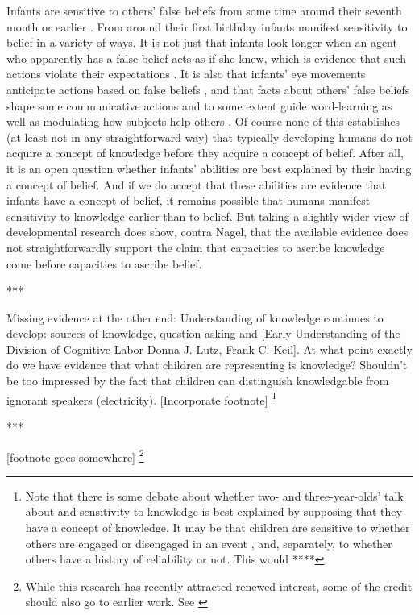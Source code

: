 \documentclass[11pt,a4paper]{extarticle}
\begin{document}
Infants are sensitive to others' false beliefs from some time around their seventh month or earlier \citep{kovacs_social_2010}.
From around their first birthday infants manifest sensitivity to belief in a variety of ways.
It is not just that infants look longer when an agent who apparently has a false belief acts as if she knew, which is evidence that such actions violate their expectations  \citep{Onishi:2005hm,Surian:2007hl}.
It is also that infants' eye movements anticipate actions based on false beliefs \citep{Southgate:2007js},
and that facts about others' false beliefs shape some communicative actions \citep{Knudsen:2011fk} and to some extent guide word-learning \citep{Carpenter:2002gc} as well as modulating how subjects help others \citep{Buttelmann:2009gy}.
Of course none of this establishes (at least not in any straightforward way) that typically developing humans do not acquire a concept of knowledge before they acquire a concept of belief.
After all, it is an open question whether infants' abilities are best explained by their having a concept of belief.
And if we do accept that these abilities are evidence that infants have a concept of belief, it remains possible that humans manifest sensitivity to knowledge earlier than to belief.
But taking a slightly wider view of developmental research does show, contra Nagel, that the available evidence does not  straightforwardly support the claim that capacities to ascribe knowledge come before  capacities to ascribe  belief.


***

Missing evidence at the other end:
Understanding of knowledge continues to develop: sources of knowledge, question-asking and [Early Understanding of the Division of Cognitive Labor Donna J. Lutz, Frank C. Keil].
At what point exactly do we have evidence that what children are representing is knowledge?
Shouldn't be too impressed by the fact that children can distinguish knowledgable from ignorant speakers (electricity).
[Incorporate footnote]%
\footnote{
Note that there is some debate about whether two- and three-year-olds' talk about and sensitivity to knowledge is best explained by supposing that they have a concept of knowledge.
It may be that children are sensitive to whether others are engaged or disengaged in an event \citep{ONeill:1996um}, and, separately, to whether others have a history of reliability or not.
This would ****

} 

***

[footnote goes somewhere]%
\footnote{
While this research has recently attracted renewed interest, some of the credit should also go to earlier work. 
See \citet{Clements:1994cw,Garnham:2001jm,Garnham:2001ql,Ruffman:2001ng}
}
\end{document}
